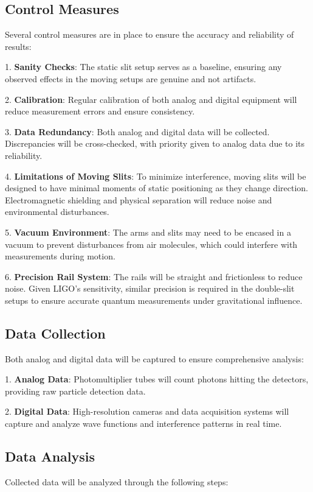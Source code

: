 \documentclass{article}
\begin{document}
\subsection{Control Measures}
Several control measures are in place to ensure the accuracy and reliability of results:

1. \textbf{Sanity Checks}: The static slit setup serves as a baseline, ensuring any observed effects in the moving setups are genuine and not artifacts.
   
2. \textbf{Calibration}: Regular calibration of both analog and digital equipment will reduce measurement errors and ensure consistency.
   
3. \textbf{Data Redundancy}: Both analog and digital data will be collected. Discrepancies will be cross-checked, with priority given to analog data due to its reliability.
   
4. \textbf{Limitations of Moving Slits}: To minimize interference, moving slits will be designed to have minimal moments of static positioning as they change direction. Electromagnetic shielding and physical separation will reduce noise and environmental disturbances.

5. \textbf{Vacuum Environment}: The arms and slits may need to be encased in a vacuum to prevent disturbances from air molecules, which could interfere with measurements during motion.

6. \textbf{Precision Rail System}: The rails will be straight and frictionless to reduce noise. Given LIGO's sensitivity, similar precision is required in the double-slit setups to ensure accurate quantum measurements under gravitational influence.

\subsection{Data Collection}
Both analog and digital data will be captured to ensure comprehensive analysis:

1. \textbf{Analog Data}: Photomultiplier tubes will count photons hitting the detectors, providing raw particle detection data.

2. \textbf{Digital Data}: High-resolution cameras and data acquisition systems will capture and analyze wave functions and interference patterns in real time.

\subsection{Data Analysis}
Collected data will be analyzed through the following steps:
\end{document}
